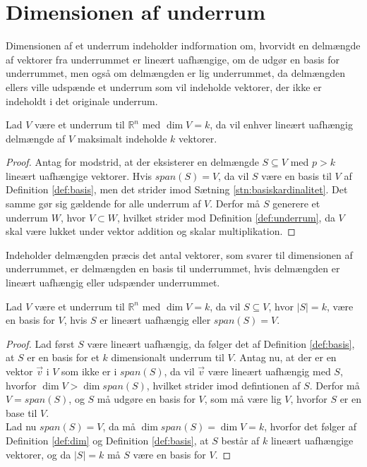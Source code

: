 \section{Dimensionen af underrum}
Dimensionen af et underrum indeholder indformation om, hvorvidt en delmængde af vektorer fra underrummet er lineært uafhængige, om de udgør en basis for underrummet, men også om delmængden er lig underrummet,
da delmængden ellers ville udspænde et underrum som vil indeholde vektorer, der ikke er indeholdt i det originale underrum.
\begin{kor}
Lad $V$ være et underrum til $\mathds{R}^n$ med $\dim{V}=k$, da vil enhver lineært uafhængig delmængde af $V$ maksimalt indeholde $k$ vektorer.
\label{kor:linearuafhangighedunderrum}
\end{kor}
\begin{proof}
Antag for modstrid, at der eksisterer en delmængde $S \subseteq V$ med $p > k$ lineært uafhængige vektorer. 
Hvis $span(S) = V$, da vil $S$ være en basis til $V$ af Definition \ref{def:basis}, men det strider imod Sætning \ref{stn:basiskardinalitet}. Det samme gør sig gældende for alle underrum af $V$.
Derfor må $S$ generere et underrum $W$, hvor $V \subset W$, hvilket strider mod Definition \ref{def:underrum}, da $V$ skal være lukket under vektor addition og skalar multiplikation.
\end{proof}
Indeholder delmængden præcis det antal vektorer, som svarer til dimensionen af underrummet, er delmængden en basis til underrummet, hvis delmængden er lineært uafhængig eller udspænder underrummet.
\begin{kor}
Lad $V$ være et underrum til $\mathds{R}^n$ med $\dim{V}=k$, da vil $S \subseteq V$, hvor $|S|=k$, være en basis for $V$, hvis $S$ er lineært uafhængig eller $span(S) = V$.
\label{kor:serbase}
\end{kor}
\begin{proof}
Lad først $S$ være lineært uafhængig, da følger det af Definition \ref{def:basis}, at $S$ er en basis for et $k$ dimensionalt underrum til $V$.
Antag nu, at der er en vektor $\vec{v}$ i $V$ som ikke er i $span(S)$, da vil $\vec{v}$ være lineært uafhængig med $S$, hvorfor $\dim{V} > \dim{span(S)}$, hvilket strider imod defintionen af $S$. 
Derfor må $V = span(S)$, og $S$ må udgøre en basis for $V$, som må være lig $V$, hvorfor $S$ er en base til $V$.
\\Lad nu $span(S) = V$, da må $\dim{span(S)} = \dim{V} = k$, hvorfor det følger af Definition \ref{def:dim} og Definition \ref{def:basis}, at $S$ består af $k$ lineært uafhængige vektorer, og da $|S|=k$ må $S$ være en basis for $V$.
\end{proof}
